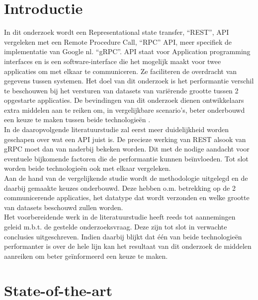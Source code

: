 
\section{Introductie}%
\label{sec:introductie}

In dit onderzoek wordt een Representational state transfer, ``REST'', API vergeleken met een Remote Procedure Call, ``RPC'' API, meer specifiek de
implementatie van Google nl. ``gRPC''. API staat voor Application programming interfaces en is een software-interface die het mogelijk maakt voor twee
applicaties om met elkaar te communiceren. Ze faciliteren de overdracht van gegevens tussen systemen. Het doel van dit onderzoek is het performantie verschil
te beschouwen bij het versturen van datasets van variërende grootte tussen 2 opgestarte applicaties. De bevindingen van dit onderzoek dienen ontwikkelaars
extra middelen aan te reiken om, in vergelijkbare scenario's, beter onderbouwd een keuze te maken tussen beide technologieën .\\

In de daaropvolgende literatuurstudie zal eerst meer duidelijkheid worden geschapen over wat een API juist is. De precieze werking van REST alsook van gRPC
moet dan van naderbij bekeken worden. Dit met de nodige aandacht voor eventuele bijkomende factoren die de performantie kunnen beïnvloeden.
Tot slot worden beide technologieën ook met elkaar vergeleken.\\

Aan de hand van de vergelijkende studie wordt de methodologie uitgelegd en de daarbij gemaakte keuzes onderbouwd. Deze hebben o.m. betrekking op de 2
communicerende applicaties, het datatype dat wordt verzonden en welke grootte van datasets beschouwd zullen worden.\\

Het voorbereidende werk in de literatuurstudie heeft reeds tot aannemingen geleid m.b.t. de gestelde onderzoeksvraag. Deze zijn tot slot in verwachte conclusies uitgeschreven.
Indien daarbij blijkt dat één van beide technologieën performanter is over de hele lijn kan het resultaat van dit onderzoek de middelen aanreiken om beter geïnformeerd een keuze te maken.


\section{State-of-the-art}%
\label{sec:state-of-the-art}

